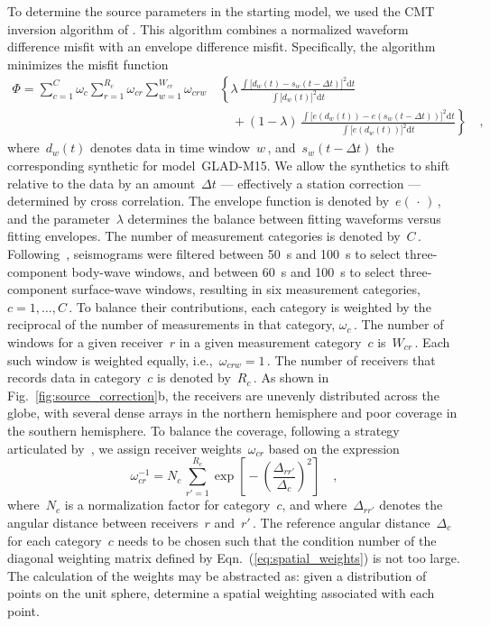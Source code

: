 \documentclass[extra,mreferee]{gji}
\begin{document}
To determine the source parameters in the starting model,
we used the CMT inversion algorithm of \cite{liu2004spectral}.
This algorithm combines a normalized waveform difference misfit with an envelope difference misfit.
Specifically, the algorithm minimizes the misfit function
\begin{equation}
   \begin{split}
      \Phi =  \sum\limits_{c=1}^{C} \omega_c \sum\limits_{r=1}^{R_c} \omega_{cr}
       \sum\limits_{w=1}^{W_{cr}} \omega_{crw}\,
          & \left\{ \lambda\, \frac
              { \int \big[ d_w(t) - s_w(t - \Delta t) \big]^2 \mathrm{d}t}
              {\int \big[ d_w(t) \big]^2  \mathrm{d}t} \right.
       \\ & \quad \left. \mbox{} + (1 - \lambda)\, \frac
              {\int \big[ e(d_w(t)) - e(s_w(t - \Delta t)) \big]^2 \mathrm{d}t}
              {\int \big[ e(d_w(t)) \big]^2\mathrm{d}t} \right\}
              \quad ,
   \end{split}
\end{equation}
where~$d_w(t)$ denotes data in time window~$w$\,,
and~$s_w(t - \Delta t)$ the corresponding synthetic for model~GLAD-M15.
We allow the synthetics to shift relative to the data by an amount~$\Delta t$
--- effectively a station correction --- determined by cross correlation.
The envelope function is denoted by~$e(\,\cdot\,)$\,,
and the parameter~$\lambda$ determines the balance between fitting waveforms versus fitting envelopes.
The number of measurement categories is denoted by~$C$\,.
Following~\cite{ekstrom2012global},
seismograms were filtered between 50~s and 100~s
to select three-component body-wave windows,
and between 60~s and 100~s to select three-component
surface-wave windows,
resulting in six measurement categories, $c=1,\ldots,C$\,.
To balance their contributions,
each category is weighted by the reciprocal of the number of measurements in that
category, $\omega_c$\,.
The number of windows for a given receiver~$r$ in a given measurement category~$c$ is~$W_{cr}$\,.
Each such window is weighted equally, i.e.,~$\omega_{crw}=1$\,.
The number of receivers that records data in category~$c$ is denoted by~$R_c$\,.
As shown in Fig.~\ref{fig:source_correction}b,
the receivers are unevenly distributed across the globe,
with several dense arrays in the northern hemisphere and poor coverage in the southern hemisphere.
To balance the coverage,
following a strategy articulated by~\cite{Ruanetal2018},
we assign receiver weights~$\omega_{cr}$ based on the expression
\begin{equation}
\omega_{cr}^{-1} = N_c\,\sum_{r'=1}^{R_c} \exp\left[\mbox{}-\left(\frac{\Delta_{rr'}}{\Delta_c}\right)^2\right]
\quad ,
\label{eq:spatial_weights}
\end{equation}
where~$N_c$ is a normalization factor for category~$c$,
and where~$\Delta_{rr'}$ denotes the angular distance between receivers~$r$ and~$r'$\,.
The reference angular distance~$\Delta_c$ for each category~$c$ needs to be chosen such that the condition 
number of the diagonal weighting matrix defined by Eqn.~(\ref{eq:spatial_weights}) is not too large.
The calculation of the weights may be abstracted as: given a distribution of
points on the unit sphere, determine a spatial weighting associated with each point.
\end{document}
